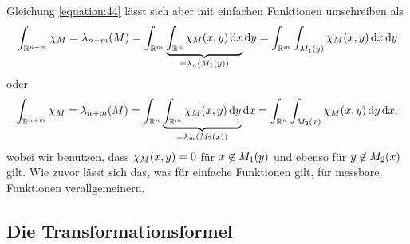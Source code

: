 Gleichung \eqref{equation:44} lässt sich aber mit einfachen Funktionen umschreiben als
\[
	\int_{\R^{n + m}}\chi_M = \lambda_{n + m}\parentheses*{M} = \int_{\R^m}\underbrace{\int_{\R^n}\chi_M\parentheses*{x, y}\d x}_{= \lambda_n\parentheses*{M_1\parentheses*{y}}}\d y = \int_{\R^m}\int_{M_1\parentheses*{y}}\chi_M\parentheses*{x, y}\d x\d y
\]
oder
\[
	\int_{\R^{n + m}}\chi_M = \lambda_{n + m}\parentheses*{M} = \int_{\R^n}\underbrace{\int_{\R^m}\chi_M\parentheses*{x, y}\d y}_{= \lambda_m\parentheses*{M_2\parentheses*{x}}}\d x = \int_{\R^n}\int_{M_2\parentheses*{x}}\chi_M\parentheses*{x, y}\d y\d x,
\]
wobei wir benutzen, dass \(\chi_M\parentheses*{x, y} = 0\) für \(x \not\in M_1\parentheses*{y}\) und ebenso für \(y \not\in M_2\parentheses*{x}\) gilt.
Wie zuvor lässt sich das, was für einfache Funktionen gilt, für messbare Funktionen verallgemeinern.


\subsection{Die Transformationsformel}
